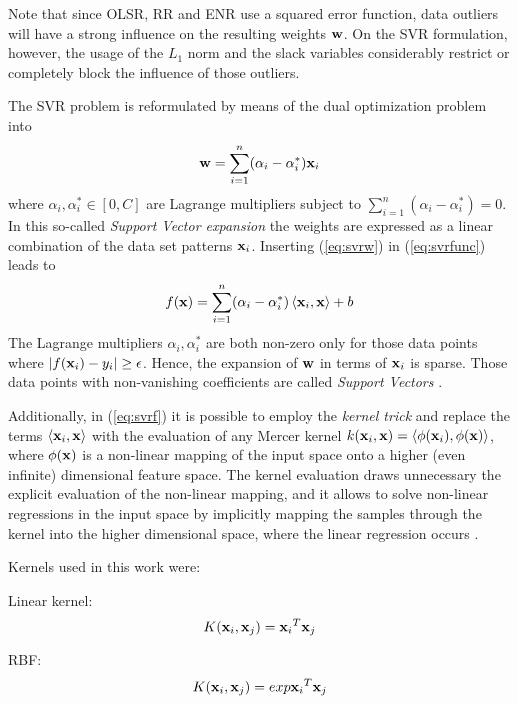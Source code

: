 Note that since OLSR, RR and ENR use a squared error function, data
outliers will have a strong influence on the resulting weights
$\mathbf{w}$.  On the SVR formulation, however, the usage of the $L_1$
norm and the slack variables considerably restrict or completely block
the influence of those outliers.

The SVR problem is reformulated by means of the dual optimization
problem into \citep{Smola2004}
\begin{equation}
  \label{eq:svrw}
  \mathbf{w}=\sum_{i=1}^n(\alpha_i-\alpha_i^\ast)\mathbf{x}_i
\end{equation}
where $\alpha_i,\alpha_i^\ast\in[0,C]$ are Lagrange multipliers
subject to $\sum_{i=1}^n(\alpha_i-\alpha_i^\ast)=0$.
%
In this so-called \emph{Support Vector expansion} the weights are
expressed as a linear combination of the data set patterns
$\mathbf{x}_i$.
%
Inserting (\ref{eq:svrw}) in (\ref{eq:svrfunc}) leads to
\begin{equation}
  \label{eq:svrf}
 f(\mathbf{x}) = \sum_{i=1}^n(\alpha_i-\alpha_i^\ast)\left\langle\mathbf{x}_i,\mathbf{x}\right\rangle + b
\end{equation}
The Lagrange multipliers $\alpha_i,\alpha_i^\ast$ are both non-zero
only for those data points where $|f(\mathbf{x}_i) - y_i|\geq\epsilon$.
Hence, the expansion of $\mathbf{w}$ in terms of $\mathbf{x}_i$ is sparse.
Those data points with non-vanishing coefficients are called
\emph{Support Vectors} \citep{Wei2013}.

Additionally, in (\ref{eq:svrf}) it is possible to employ the
\emph{kernel trick} and replace the terms $\left\langle\mathbf{x}_i,\mathbf{x}\right\rangle$ with
the evaluation of any Mercer kernel
$k(\mathbf{x}_i,\mathbf{x})=\left\langle\phi(\mathbf{x}_i),\phi(\mathbf{x})\right\rangle$, where
$\phi(\mathbf{x})$ is a non-linear mapping of the input space onto a
higher (even infinite) dimensional feature space.
%
The kernel evaluation draws unnecessary the explicit evaluation of the
non-linear mapping, and it allows to solve non-linear regressions in
the input space by implicitly mapping the samples through the kernel
into the higher dimensional space, where the linear regression occurs
\citep{Alonso2013}.

Kernels used in this work were:

Linear kernel: 
\begin{equation*}
K(\mathbf{x}_i,\mathbf{x}_j)={\mathbf{x}_i}^T \mathbf{x}_j
\end{equation*}

RBF: 
\begin{equation*}
K(\mathbf{x}_i,\mathbf{x}_j)= exp{\mathbf{x}_i}^T \mathbf{x}_j
\end{equation*}

